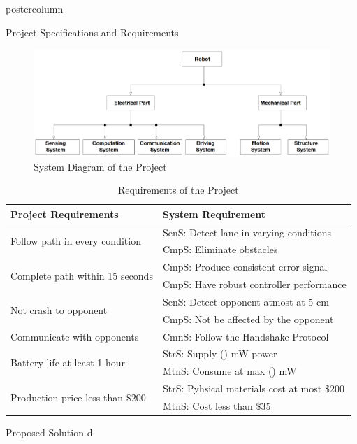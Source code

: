 \documentclass{beamer}
\begin{document}
\begin{frame}
\begin{columns}
\begin{column}{.5\textwidth}
\begin{beamercolorbox}[center]{postercolumn}
\begin{minipage}{.98\textwidth}
{			
				\begin{myblock}{Project Specifications and Requirements}
					\begin{figure}
						\centering
						\includegraphics[width=\textwidth]{img/systems}
						\caption{System Diagram of the Project}
						\label{fig:overall-system}
					\end{figure}
				\vspace{1cm}
				\begin{table}
					\caption{Requirements of the Project}
					\begin{tabular}{ll}
						Project Requirements   & System Requirement \\
						\hline 
						\multirow{2}{*}{Follow path in every condition }       &  SenS: Detect lane in varying conditions       \\
						&  CmpS: Eliminate obstacles \\
						\hline
						\multirow{2}{*}{Complete path within 15 seconds}    & CmpS: Produce consistent error signal  \\
						& CmpS: Have robust controller performance  \\
						\hline
						\multirow{2}{*}{Not crash to opponent}   & SenS: Detect opponent atmost at 5 cm        \\
						& CmpS: Not be affected by the opponent \\
						\hline
						\multirow{2}{*}{Communicate with opponents}  & \multirow{2}{*}{CmnS: Follow the Handshake Protocol}      \\
						& \\
						\hline
						\multirow{2}{*}{Battery life at least 1 hour} & StrS: Supply () mW power \\
						&  MtnS: Consume at max () mW \\
						\hline
						\multirow{2}{*}{Production price less than  $\$200$} & StrS: Pyhsical materials cost at most  $\$200$\\
						& MtnS: Cost less than $\$35$  \\
						\hline
					\end{tabular}
				\end{table}
	\end{myblock}	\vspace{0.4em}
	\begin{myblock}{Proposed Solution}
		d
	\end{myblock}	

}
\end{minipage}
\end{beamercolorbox}
\end{column}
\end{columns}
\end{frame}
\end{document}
